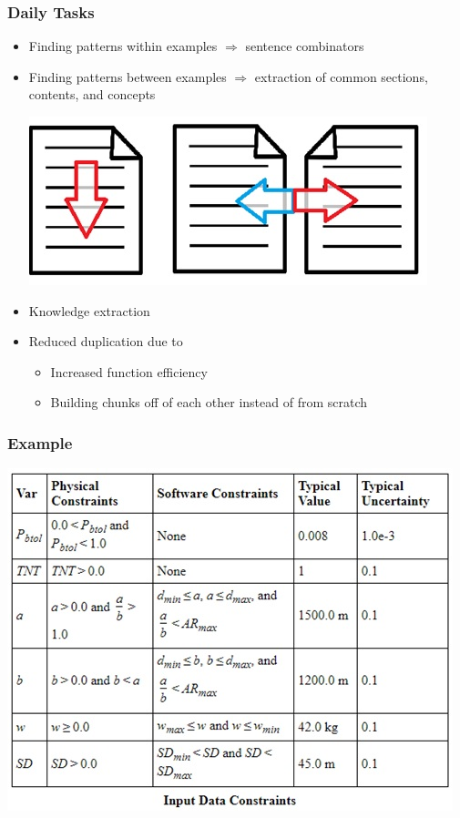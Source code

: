 \documentclass{beamer}
\begin{document}
\begin{frame}
\frametitle{Daily Tasks}
\begin{itemize}
 \item<1-> Finding patterns within examples $\Rightarrow$ sentence combinators
 \item<1-> Finding patterns between examples $\Rightarrow$ extraction of common sections, contents, and concepts
 \begin{center}
  \includegraphics[scale=0.6]{../WG2_11/WinAndBwExamples.jpg}
 \end{center}
 \item<2-> Knowledge extraction
 \item<2-> Reduced duplication due to
  \begin{itemize}
   \item Increased function efficiency
   \item Building chunks off of each other instead of from scratch
  \end{itemize}
\end{itemize}
\end{frame}

\begin{frame}
\frametitle{Example}
\centering
\includegraphics[scale=0.7]{InDataConsEx.jpg}
\end{frame}
\end{document}
